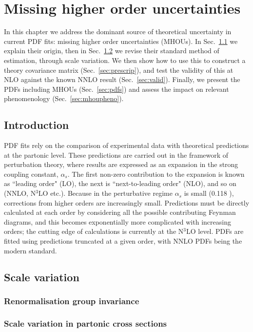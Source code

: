 \chapter{Missing higher order uncertainties}

In this chapter we address the dominant source of theoretical uncertainty in current PDF fits: missing higher order uncertainties (MHOUs). In Sec.~\ref{sec:intro} we explain their origin, then in Sec.~\ref{sec:svn} we revise their standard method of estimation, through scale variation. We then show how to use this to construct a theory covariance matrix (Sec.~\ref{sec:prescrip}), and test the validity of this at NLO against the known NNLO result (Sec.~\ref{sec:valid}). Finally, we present the PDFs including MHOUs (Sec.~\ref{sec:pdfs}) and assess the impact on relevant phenomenology (Sec.~\ref{sec:mhoupheno}).

\section{Introduction}
\label{sec:intro}
PDF fits rely on the comparison of experimental data with theoretical predictions at the partonic level. These predictions are carried out in the framework of perturbation theory, where results are expressed as an expansion in the strong coupling constant, $\alpha_s$. The first non-zero contribution to the expansion is known as ``leading order" (LO), the next is ``next-to-leading order" (NLO), and so on (NNLO, N$^3$LO etc.). Because in the perturbative regime $\alpha_s$ is small (0.118 \cite{pdg}), corrections from higher orders are increasingly small. Predictions must be directly calculated at each order by considering all the possible contributing Feynman diagrams, and this becomes exponentially more complicated with increasing orders; the cutting edge of calculations is currently at the N$^3$LO level. PDFs are fitted using predictions truncated at a given order, with NNLO PDFs being the modern standard. 

\section{Scale variation}
\label{sec:svn}

\subsection{Renormalisation group invariance}

\subsection{Scale variation in partonic cross sections}
